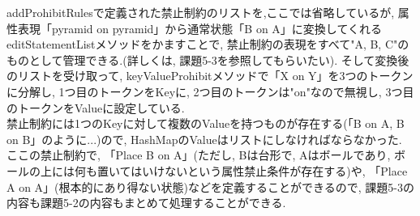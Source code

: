 \documentclass[uplatex,12pt]{jsarticle}
\begin{document}
addProhibitRulesで定義された禁止制約のリストを,ここでは省略しているが, 属性表現「pyramid on pyramid」から通常状態「B on A」に変換してくれるeditStatementListメソッドをかますことで, 禁止制約の表現をすべて"A, B, C"のものとして管理できる.(詳しくは, 課題5-3を参照してもらいたい). そして変換後のリストを受け取って, keyValueProhibitメソッドで「X on Y」を3つのトークンに分解し, 1つ目のトークンをKeyに, 2つ目のトークンは"on"なので無視し, 3つ目のトークンをValueに設定している.\\
禁止制約には1つのKeyに対して複数のValueを持つものが存在する(「B on A, B on B」のように...)ので, HashMapのValueはリストにしなければならなかった.\\
ここの禁止制約で, 「Place B on A」(ただし, Bは台形で, Aはボールであり, ボールの上には何も置いてはいけないという属性禁止条件が存在する)や, 「Place A on A」(根本的にあり得ない状態)などを定義することができるので, 課題5-3の内容も課題5-2の内容もまとめて処理することができる.\\
\end{document}
